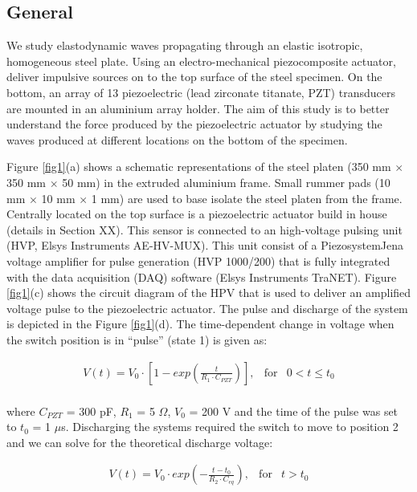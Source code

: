 \documentclass[preprint,3p, 11pt,authoryear]{elsarticle}
\begin{document}
\subsection{General}

We study elastodynamic waves propagating through an elastic isotropic, homogeneous steel plate. Using an electro-mechanical piezocomposite actuator, deliver impulsive sources on to the top surface of the steel specimen. On the bottom, an array of 13 piezoelectric (lead zirconate titanate, PZT) transducers are mounted in an aluminium array holder. The aim of this study is to better understand the force produced by the piezoelectric actuator by studying the waves produced at different locations on the bottom of the specimen.

Figure \ref{fig1}(a) shows a schematic representations of the steel platen (350 mm $\times$ 350 mm $\times$ 50 mm) in the extruded aluminium frame. Small rummer pads (10 mm $\times$ 10 mm $\times$ 1 mm) are used to base isolate the steel platen from the frame. Centrally located on the top surface is a piezoelectric actuator build in house (details in Section XX).  This sensor is connected to an high-voltage pulsing unit (HVP, Elsys Instruments AE-HV-MUX). This unit consist of a PiezosystemJena voltage amplifier for pulse generation (HVP 1000/200) that is fully integrated with the data acquisition (DAQ) software (Elsys Instruments TraNET). Figure \ref{fig1}(c) shows the circuit diagram of the HPV that is used to deliver an amplified voltage pulse to the piezoelectric actuator. The pulse and discharge of the system is depicted in the Figure \ref{fig1}(d). The time-dependent change in voltage when the switch position is in ``pulse'' (state 1) is given as:

\begin{equation}
\begin{array}{lcc}
  V(t) =  V_{0} \cdot \left[ 1 - exp\left(\frac{t}{R_{1}\cdot C_{PZT}} \right) \right], & \text{for} & 0 < t \leq t_{0}\\
\end{array}
\label{eq1}
\end{equation}

\noindent where $C_{PZT}$ = 300 pF, $R_{1}$ = 5 $\Omega$, $V_{0}$ = 200 V and the time of the pulse was set to $t_{0}$ = 1 $\mu$s. Discharging the systems required the switch to move to position 2 and we can solve for the theoretical discharge voltage:

\begin{equation}
\begin{array}{lclcc}
  V(t) =  V_{0} \cdot exp\left(-\frac{t - t_{0}}{R_{2}\cdot C_{eq}}\right), & \text{for} & t > t_{0}\\
\end{array}
\label{eq2}
\end{equation}
\end{document}
